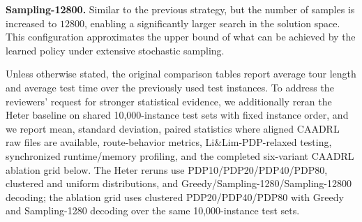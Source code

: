 \documentclass[pdflatex,sn-basic,Numbered]{sn-jnl}
\begin{document}
\textbf{Sampling-12800.} Similar to the previous strategy, but the number of samples is increased to $12800$, enabling a significantly larger search in the solution space. This configuration approximates the upper bound of what can be achieved by the learned policy under extensive stochastic sampling.

Unless otherwise stated, the original comparison tables report average tour length and average test time over the previously used test instances. To address the reviewers' request for stronger statistical evidence, we additionally reran the Heter baseline on shared 10,000-instance test sets with fixed instance order, and we report mean, standard deviation, paired statistics where aligned CAADRL raw files are available, route-behavior metrics, Li\&Lim-PDP-relaxed testing, synchronized runtime/memory profiling, and the completed six-variant CAADRL ablation grid below. The Heter reruns use PDP10/PDP20/PDP40/PDP80, clustered and uniform distributions, and Greedy/Sampling-1280/Sampling-12800 decoding; the ablation grid uses clustered PDP20/PDP40/PDP80 with Greedy and Sampling-1280 decoding over the same 10,000-instance test sets.
\end{document}
